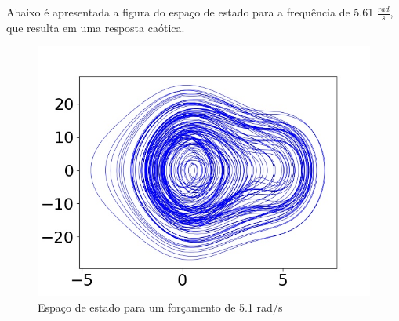 
Abaixo é apresentada a figura do espaço de estado para a frequência de 5.61 $\frac{rad}{s}$, que resulta em uma resposta caótica.

\begin{figure}[!ht]
	\centering
	\includegraphics[scale=0.5]{state_space/figura3.jpg}
	\caption{Espaço de estado para um forçamento de 5.1 rad/s}
	\label{state_space_5.61rad/s}
\end{figure}